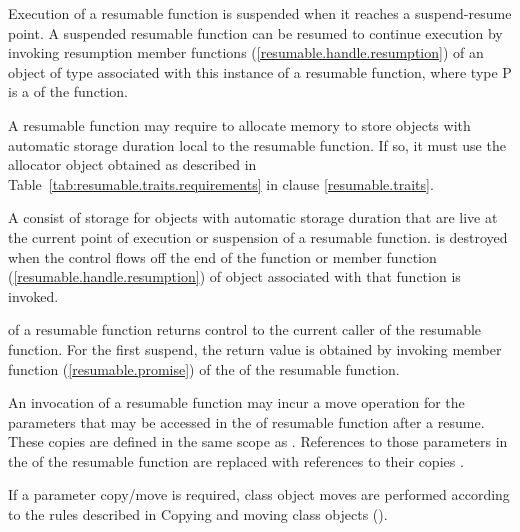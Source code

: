 \pnum
Execution of a resumable function is suspended when it reaches a suspend-resume point.
A suspended resumable function can be resumed
to continue execution by invoking
resumption member functions (\ref{resumable.handle.resumption}) of an object of  type
associated with this instance of a resumable function, where type P
is a  of the function. 

\pnum
A resumable function may require to allocate
memory to store objects with automatic storage duration
local to the resumable function. If so, it must
use the allocator object obtained as described in 
Table~\ref{tab:resumable.traits.requirements} in clause \ref{resumable.traits}.

\pnum
A  consist of 
storage for objects with automatic storage duration
that are live at the current point of execution or suspension of 
a resumable function.
 is destroyed when
the control flows off the end of the function or
 member function (\ref{resumable.handle.resumption}) of  object associated with that function is invoked.

\pnum 
{} of a resumable function returns control to the current
caller of the resumable function. For the first suspend, the return value is obtained by invoking member function 
 (\ref{resumable.promise})
of the  of the resumable function.

\pnum
An invocation of a resumable function may incur a move operation for the parameters that may be accessed in the 
of resumable function after a resume. These copies
are defined in the same scope as . 
References to those parameters in the 
of the resumable function are replaced with 
references to their copies .

\pnum
If a parameter copy/move is required, class object moves are performed according to the rules described in Copying and moving class objects ().

%
